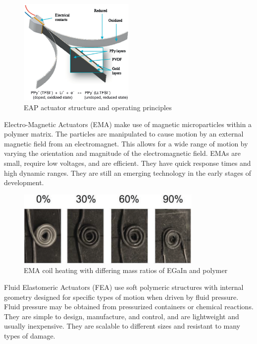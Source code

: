 \begin{figure}[H]
	\centering
	\includegraphics[width=0.5\textwidth]{EAP.png}
	\caption[EAP actuator structure]{EAP actuator structure and operating principles \citep{Mutlu2014}}
	\label{fig:eap}
\end{figure}

Electro-Magnetic Actuators (EMA) make use of magnetic microparticles within a polymer matrix. The particles are manipulated to cause motion by an external magnetic field from an electromagnet. This allows for a wide range of motion by varying the orientation and magnitude of the electromagnetic field. EMAs are small, require low voltages, and are efficient. They have quick response times and high dynamic ranges. They are still an emerging technology in the early stages of development. \citep{Do2018}

\begin{figure}[H]
	\centering
	\includegraphics[width=0.8\textwidth]{EMA.png}
	\caption[EMA coil heating]{EMA coil heating with differing mass ratios of EGaIn and polymer \citep{Do2018}}
	\label{fig:ema}
\end{figure}

Fluid Elastomeric Actuators (FEA) use soft polymeric structures with internal geometry designed for specific types of motion when driven by fluid pressure. Fluid pressure may be obtained from pressurized containers or chemical reactions. They are simple to design, manufacture, and control, and are lightweight and usually inexpensive. They are scalable to different sizes and resistant to many types of damage. \citep{Shepherd2011, Onal2017}

